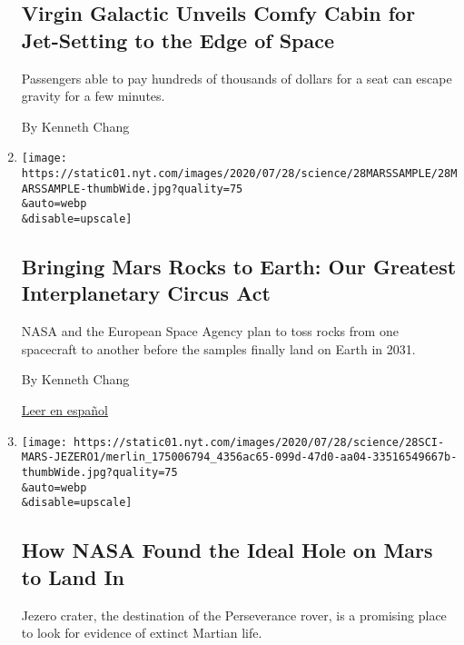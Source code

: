 \begin{enumerate}
  \hypertarget{virgin-galactic-unveils-comfy-cabin-for-jet-setting-to-the-edge-of-space}{%
  \subsection{Virgin Galactic Unveils Comfy Cabin for Jet-Setting to the
  Edge of
  Space}\label{virgin-galactic-unveils-comfy-cabin-for-jet-setting-to-the-edge-of-space}}

  Passengers able to pay hundreds of thousands of dollars for a seat can
  escape gravity for a few minutes.

  By Kenneth Chang
\item
  \href{/2020/07/28/science/mars-sample-return-mission.html}{}

  \texttt{[image: https://static01.nyt.com/images/2020/07/28/science/28MARSSAMPLE/28MARSSAMPLE-thumbWide.jpg?quality=75\\\&auto=webp\\\&disable=upscale]}

  \hypertarget{bringing-mars-rocks-to-earth-our-greatest-interplanetary-circus-act}{%
  \subsection{Bringing Mars Rocks to Earth: Our Greatest Interplanetary
  Circus
  Act}\label{bringing-mars-rocks-to-earth-our-greatest-interplanetary-circus-act}}

  NASA and the European Space Agency plan to toss rocks from one
  spacecraft to another before the samples finally land on Earth in
  2031.

  By Kenneth Chang

  \href{https://www.nytimes.com/es/2020/07/29/espanol/ciencia-y-tecnologia/mision-marte-nasa.html}{Leer
  en español}
\item
  \href{/2020/07/28/science/nasa-jezero-perseverance.html}{}

  \texttt{[image: https://static01.nyt.com/images/2020/07/28/science/28SCI-MARS-JEZERO1/merlin\_175006794\_4356ac65-099d-47d0-aa04-33516549667b-thumbWide.jpg?quality=75\\\&auto=webp\\\&disable=upscale]}

  \hypertarget{how-nasa-found-the-ideal-hole-on-mars-to-land-in}{%
  \subsection{How NASA Found the Ideal Hole on Mars to Land
  In}\label{how-nasa-found-the-ideal-hole-on-mars-to-land-in}}

  Jezero crater, the destination of the Perseverance rover, is a
  promising place to look for evidence of extinct Martian life.


\end{enumerate}
